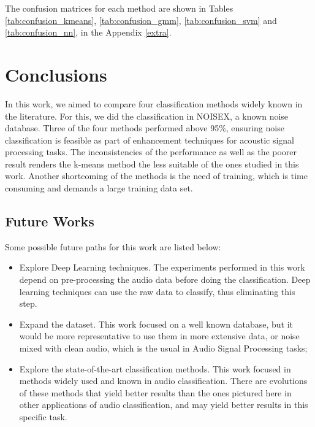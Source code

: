 \documentclass[12pt]{article}
\begin{document}
The confusion matrices for each method are shown in Tables \ref{tab:confusion_kmeans}, \ref{tab:confusion_gmm}, \ref{tab:confusion_svm} and \ref{tab:confusion_nn}, in the Appendix \ref{extra}.

\section{Conclusions} \label{conc}

In this work, we aimed to compare four classification methods widely known in the literature. For this, we did the classification in NOISEX, a known noise database. Three of the four methods performed above 95\%, ensuring noise classification is feasible as part of enhancement techniques for acoustic signal processing tasks. The inconsistencies of the performance as well as the poorer result renders the k-means method the less suitable of the ones studied in this work. Another shortcoming of the methods is the need of training, which is time consuming and demands a large training data set.

\subsection{Future Works}

Some possible future paths for this work are listed below:

\begin{itemize}
	\item Explore Deep Learning techniques. The experiments performed in this work depend on pre-processing the audio data before doing the classification. Deep learning techniques can use the raw data to classify, thus eliminating this step. 
	\item Expand the dataset. This work focused on a well known database, but it would be more representative to use them in more extensive data, or noise mixed with clean audio, which is the usual in Audio Signal Processing tasks;
	\item Explore the state-of-the-art classification methods. This work focused in methods widely used and known in audio classification. There are evolutions of these methods that yield better results than the ones pictured here in other applications of audio classification, and may yield better results in this specific task.
\end{itemize}

\end{document}
